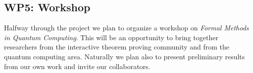 \documentclass[a4paper]{article}
\begin{document}
\subsection*{WP5: Workshop}
\label{sec:wp5:-summerschool}

Halfway through the project we plan to organize a workshop on
\emph{Formal Methods in Quantum Computing}. This will be an
opportunity to bring together researchers from the interactive theorem
proving community and from the quantum computing area. Naturally we
plan also to present preliminary results from our own work and invite
our collaborators.




\end{document}

